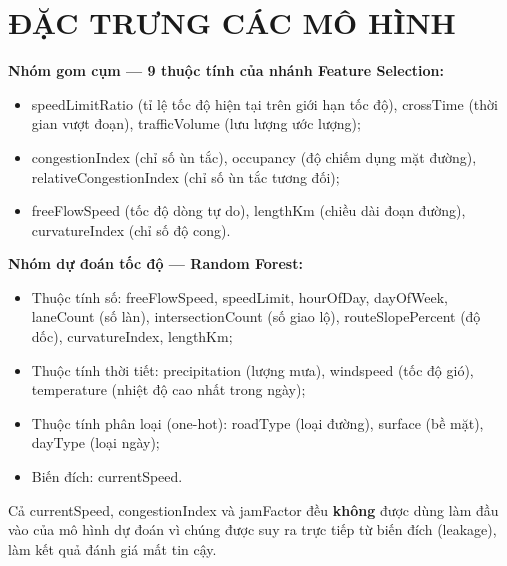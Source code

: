 \documentclass[12pt,a4paper]{report}
\begin{document}
\chapter{ĐẶC TRƯNG CÁC MÔ HÌNH}
\textbf{Nhóm gom cụm --- 9 thuộc tính của nhánh Feature Selection:}
\begin{itemize}[nosep]
    \item speedLimitRatio (tỉ lệ tốc độ hiện tại trên giới hạn tốc độ), crossTime (thời gian vượt đoạn), trafficVolume (lưu lượng ước lượng);
    \item congestionIndex (chỉ số ùn tắc), occupancy (độ chiếm dụng mặt đường), relativeCongestionIndex (chỉ số ùn tắc tương đối);
    \item freeFlowSpeed (tốc độ dòng tự do), lengthKm (chiều dài đoạn đường), curvatureIndex (chỉ số độ cong).
\end{itemize}
\textbf{Nhóm dự đoán tốc độ --- Random Forest:}
\begin{itemize}[nosep]
    \item Thuộc tính số: freeFlowSpeed, speedLimit, hourOfDay, dayOfWeek, laneCount (số làn), intersectionCount (số giao lộ), routeSlopePercent (độ dốc), curvatureIndex, lengthKm;
    \item Thuộc tính thời tiết: precipitation (lượng mưa), windspeed (tốc độ gió), temperature (nhiệt độ cao nhất trong ngày);
    \item Thuộc tính phân loại (one-hot): roadType (loại đường), surface (bề mặt), dayType (loại ngày);
    \item Biến đích: currentSpeed.
\end{itemize}
Cả currentSpeed, congestionIndex và jamFactor đều \textbf{không} được dùng làm đầu vào của mô hình dự đoán vì chúng được suy ra trực tiếp từ biến đích (leakage), làm kết quả đánh giá mất tin cậy.
\end{document}
